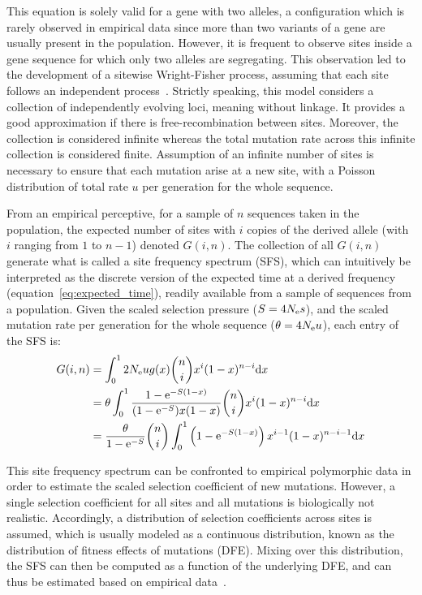This equation is solely valid for a gene with two \glspl{allele}, a configuration which is rarely observed in empirical data since more than two variants of a gene are usually present in the population.
However, it is frequent to observe sites inside a gene sequence for which only two \glspl{allele} are segregating.
This observation led to the development of a sitewise Wright-Fisher process, assuming that each site follows an independent process~\citep{Sawyer1992}.
Strictly speaking, this model considers a collection of independently evolving loci, meaning without linkage.
It provides a good approximation if there is free-recombination between sites.
Moreover, the collection is considered infinite whereas the total mutation rate across this infinite collection is considered finite.
Assumption of an infinite number of sites is necessary to ensure that each mutation arise at a new site, with a Poisson distribution of total rate $u$ per generation for the whole sequence.

From an empirical perceptive, for a sample of $n$ sequences taken in the population, the expected number of sites with $i$ copies of the derived allele (with $i$ ranging from $1$ to $n - 1$) denoted $G(i, n)$.
The collection of all $G(i, n)$ generate what is called a site frequency spectrum (\acrshort{SFS}), which can intuitively be interpreted as the discrete version of the expected time at a derived frequency (equation~\ref{eq:expected_time}), readily available from a sample of sequences from a population.
Given the scaled selection pressure ($S=4 N_{\textrm{e}} s$), and the scaled mutation rate per generation for the whole sequence ($\theta = 4 N_{\textrm{e}} u $), each entry of the \acrshort{SFS} is:
\begin{align}
    G(i, n) & = \int_{0}^{1}  2 N_{\textrm{e}} u g(x) \binom{n}{i} x^{i} (1-x)^{n-i} \mathrm{d} x \\
    & = \theta \int_{0}^{1} \dfrac{1 - \mathrm{e}^{-S(1-x)}}{(1 - \mathrm{e}^{-S})x(1-x)} \binom{n}{i} x^{i} (1-x)^{n-i} \mathrm{d} x \\
    & =  \dfrac{\theta }{1 - \mathrm{e}^{-S}} \binom{n}{i} \int_{0}^{1} \left( 1 - \mathrm{e}^{-S(1-x)} \right) x^{i-1} (1-x)^{n-i-1} \mathrm{d} x
\end{align}

This site frequency spectrum can be confronted to empirical \gls{polymorphic} data in order to estimate the scaled selection coefficient of new mutations.
However, a single selection coefficient for all sites and all mutations is biologically not realistic.
Accordingly, a distribution of selection coefficients across sites is assumed, which is usually modeled as a continuous distribution, known as the distribution of fitness effects of mutations (DFE).
Mixing over this distribution, the SFS can then be computed as a function of the underlying DFE, and can thus be estimated based on empirical data~\citep{eyre-walker_distribution_2006, eyre-walker_estimating_2009}.


